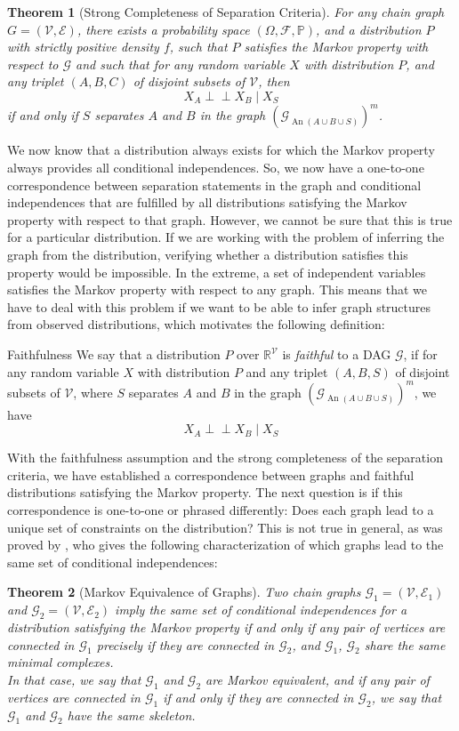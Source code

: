 \documentclass[11pt, a4paper]{memoir}
\theoremstyle{break}
\newtheorem{thm}{Theorem}
\theoremstyle{break}
\theoremstyle{nonumberplain}
\newcommand{\mR}{\mathbb{R}}
\newcommand{\mP}{\mathbb{P}}
\newcommand{\indep}{\perp \!\!\! \perp}
\DeclareMathOperator{\an}{An}
\begin{document}
\begin{thm}[Strong Completeness of Separation Criteria]\label{separate}
For any chain graph $G=(\mathcal{V},\mathcal{E})$, there exists a probability space $(\Omega, \mathcal{F}, \mP)$, and a distribution $P$ with strictly positive density $f$, such that $P$ satisfies the Markov property with respect to $\mathcal{G}$ and such that for any random variable $X$ with distribution $P$, and any triplet $(A,B,C)$ of disjoint subsets of $\mathcal{V}$, then
$$X_A\indep X_B\mid X_S$$
if and only if $S$ separates $A$ and $B$ in the graph $\left(\mathcal{G}_{\an(A\cup B\cup S)}\right)^m$.
\end{thm}
We now know that a distribution always exists for which the Markov property always provides all conditional independences. So, we now have a one-to-one correspondence between separation statements in the graph and conditional independences that are fulfilled by all distributions satisfying the Markov property with respect to that graph. However, we cannot be sure that this is true for a particular distribution. If we are working with the problem of inferring the graph from the distribution, verifying whether a distribution satisfies this property would be impossible. In the extreme, a set of independent variables satisfies the Markov property with respect to any graph. This means that we have to deal with this problem if we want to be able to infer graph structures from observed distributions, which motivates the following definition:
\begin{mydefinition}{Faithfulness}
We say that a distribution $P$ over $\mR^{\mathcal{V}}$ is \emph{faithful} to a DAG $\mathcal{G}$, if for any random variable $X$ with distribution $P$ and any triplet $(A,B,S)$ of disjoint subsets of $\mathcal{V}$, where $S$ separates $A$ and $B$ in the graph $\left(\mathcal{G}_{\an(A\cup B\cup S)}\right)^m$, we have
$$X_A\indep X_B\mid X_S$$
\end{mydefinition}
With the faithfulness assumption and the strong completeness of the separation criteria, we have established a correspondence between graphs and faithful distributions satisfying the Markov property. The next question is if this correspondence is one-to-one or phrased differently: Does each graph lead to a unique set of constraints on the distribution? This is not true in general, as was proved by \cite{Frydenberg}, who gives the following characterization of which graphs lead to the same set of conditional independences:
\begin{thm}[Markov Equivalence of Graphs]
Two chain graphs $\mathcal{G}_1=(\mathcal{V},\mathcal{E}_1)$ and $\mathcal{G}_2=(\mathcal{V},\mathcal{E}_2)$  imply the same set of conditional independences for a distribution satisfying the Markov property if and only if any pair of vertices are connected in $\mathcal{G}_1$ precisely if they are connected in $\mathcal{G}_2$, and $\mathcal{G}_1$, $\mathcal{G}_2$ share the same minimal complexes.\\[5pt]
In that case, we say that $\mathcal{G}_1$ and $\mathcal{G}_2$ are \emph{Markov equivalent}, and if any pair of vertices are connected in $\mathcal{G}_1$ if and only if they are connected in $\mathcal{G}_2$, we say that $\mathcal{G}_1$ and $\mathcal{G}_2$ have the same \emph{skeleton}.
\end{thm}
\end{document}
